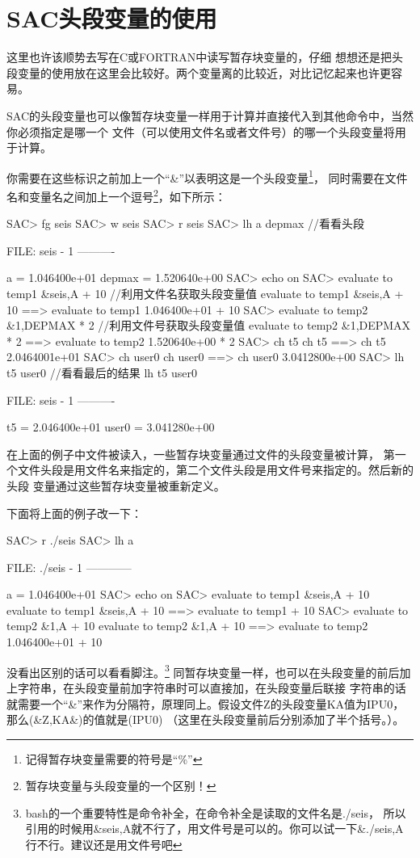\section{SAC头段变量的使用}
    
这里也许该顺势去写在C或FORTRAN中读写暂存块变量的，仔细
想想还是把头段变量的使用放在这里会比较好。两个变量离的比较近，对比记忆起来也许更容易。

SAC的头段变量也可以像暂存块变量一样用于计算并直接代入到其他命令中，当然你必须指定是哪一个
文件（可以使用文件名或者文件号）的哪一个头段变量将用于计算。

你需要在这些标识之前加上一个``\&''以表明这是一个头段变量\footnote{记得暂存块变量需要的符号是``\%''}，
同时需要在文件名和变量名之间加上一个逗号\footnote{暂存块变量与头段变量的一个区别！}，如下所示：
\begin{SACCode}
SAC> fg seis
SAC> w seis
SAC> r seis
SAC> lh a depmax                            //看看头段
   
  FILE: seis - 1
 ----------

          a = 1.046400e+01
     depmax = 1.520640e+00
SAC> echo on
SAC> evaluate to temp1 &seis,A + 10         //利用文件名获取头段变量值
 evaluate to temp1 &seis,A + 10
 ==> evaluate to temp1 1.046400e+01 + 10
SAC> evaluate to temp2 &1,DEPMAX * 2        //利用文件号获取头段变量值
 evaluate to temp2 &1,DEPMAX * 2
 ==> evaluate to temp2 1.520640e+00 * 2
SAC> ch t5 %
 ch t5 %
 ==> ch t5 2.0464001e+01
SAC> ch user0 %
 ch user0 %
 ==> ch user0 3.0412800e+00
SAC> lh t5 user0                            //看看最后的结果
 lh t5 user0
  
  FILE: seis - 1
 ----------

        t5 = 2.046400e+01
     user0 = 3.041280e+00
\end{SACCode}
在上面的例子中文件被读入，一些暂存块变量通过文件的头段变量被计算，
第一个文件头段是用文件名来指定的，第二个文件头段是用文件号来指定的。然后新的头段
变量通过这些暂存块变量被重新定义。

下面将上面的例子改一下：
\begin{SACCode}
SAC> r ./seis 
SAC> lh a 
  
  FILE: ./seis - 1
 ------------

     a = 1.046400e+01
SAC> echo on
SAC> evaluate to temp1 &seis,A + 10
 evaluate to temp1 &seis,A + 10
 ==> evaluate to temp1  + 10
SAC> evaluate to temp2 &1,A + 10
 evaluate to temp2 &1,A + 10
 ==> evaluate to temp2 1.046400e+01 + 10
\end{SACCode}
没看出区别的话可以看看脚注。\footnote{bash的一个重要特性是命令补全，在命令补全是读取的文件名是./seis，
所以引用的时候用\&seis,A就不行了，用文件号是可以的。你可以试一下\&./seis,A行不行。建议还是用文件号吧}
同暂存块变量一样，也可以在头段变量的前后加上字符串，在头段变量前加字符串时可以直接加，在头段变量后联接
字符串的话就需要一个``\&''来作为分隔符，原理同上。假设文件Z的头段变量KA值为IPU0，那么(\&Z,KA\&)的值就是(IPU0)
（这里在头段变量前后分别添加了半个括号。）。
